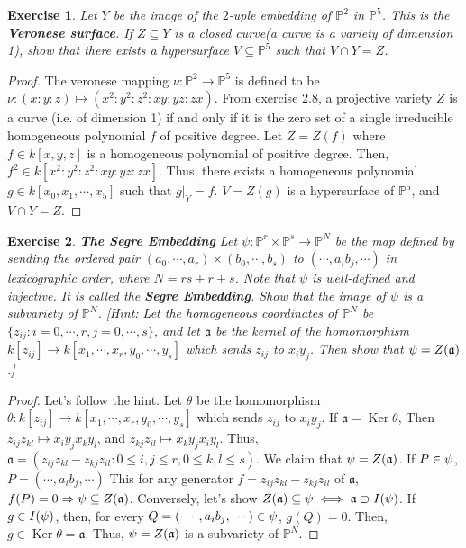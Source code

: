 \documentclass[12pt,letterpaper]{article}
\newtheorem{problem}{Exercise}[section]
\theoremstyle{definition}
\theoremstyle{remark}
\numberwithin{equation}{section}
\numberwithin{figure}{problem}
\let\Im\relax
\DeclareMathOperator{\Im}{im}
\DeclareMathOperator{\Ker}{Ker}
\newcommand{\PP}{\mathbb{P}}
\begin{document}
\begin{problem} Let $Y$ be the image of the $2$-uple embedding of $\PP^2$ in $\PP^5$. This is the \textbf{Veronese surface}. If $Z \subseteq Y$ is a closed curve(a curve is a variety of dimension 1), show that there exists a hypersurface $V \subseteq \PP^5$ such that $V \cap Y = Z$. 
\end{problem}

\begin{proof}
The veronese mapping $\nu: \PP^2 \to \PP^5$ is defined to be $\nu: (x:y:z) \mapsto (x^2: y^2:z^2:xy:yz:zx)$. From exercise 2.8, a projective variety $Z$ is a curve (i.e. of dimension 1) if and only if it is the zero set of a single irreducible homogeneous polynomial $f$ of positive degree. Let $Z = Z(f)$ where $f \in k[x,y,z]$ is a homogeneous polynomial of positive degree. Then, $f^2 \in k[x^2:y^2:z^2:xy:yz:zx]$. Thus, there exists a homogeneous polynomial $g \in k[x_0, x_1, \cdots, x_5]$ such that $g|_Y = f$. $V = Z(g)$ is a hypersurface of $\PP^5$, and $V \cap Y = Z$. 
\end{proof}

\begin{problem} \textbf{The Segre Embedding} Let $\psi : \PP^r \times \PP^s \to \PP^N$ be the map defined by sending the ordered pair $(a_0, \cdots, a_r) \times (b_0, \cdots, b_s)$ to $(\cdots, a_ib_j, \cdots)$ in lexicographic order, where $N = rs + r +s$. Note that $\psi$ is well-defined and injective. It is called the \textbf{Segre Embedding}. Show that the image of $\psi$ is a subvariety of $\PP^N$. [Hint: Let the homogeneous coordinates of $\PP^N$ be $\{z_{ij}:i=0, \cdots, r, j = 0,\cdots, s\}$, and let $\mathfrak{a}$ be the kernel of the homomorphism $k[{z_{ij}}] \to k [x_1, \cdots, x_r, y_0, \cdots, y_s]$ which sends $z_{ij}$ to $x_iy_j$. Then show that $\Im \psi = Z(\mathfrak{a})$.]
\end{problem}

\begin{proof}
Let's follow the hint. Let $\theta$ be the homomorphism $\theta: k[{z_{ij}}] \to k [x_1, \cdots, x_r, y_0, \cdots, y_s]$ which sends $z_{ij}$ to $x_iy_j$. If $\mathfrak{a} = \Ker \theta$, Then $z_{ij} z_{kl} \mapsto x_iy_jx_ky_l$, and $z_{kj}z_{il} \mapsto x_ky_jx_iy_l$. Thus, $\mathfrak{a} = (z_{ij}z_{kl} -z_{kj}z_{il}:0\leq i,j \leq r, 0 \leq k,l \leq s)$. We claim that $\Im \psi = Z(\mathfrak{a})$. If $P \in \Im \psi$, $P = (\cdots, a_ib_j,\cdots)$ This for any generator $f = z_{ij}z_{kl}-z_{kj}z_{il}$ of $\mathfrak{a}$, $f(P) = 0 \Rightarrow \Im \psi \subseteq Z(\mathfrak{a})$. Conversely, let's show $Z(\mathfrak{a}) \subseteq \Im\psi \iff \mathfrak{a} \supset I(\Im\psi)$. If $g \in I(\Im \psi)$, then, for every $Q = (\cdots,a_ib_j, \cdots) \in \Im\psi$, $g(Q) = 0$. Then, $g \in \Ker \theta = \mathfrak{a}$. Thus, $\Im \psi = Z(\mathfrak{a})$ is a subvariety of $\PP^N$. 
\end{proof}
\end{document}
